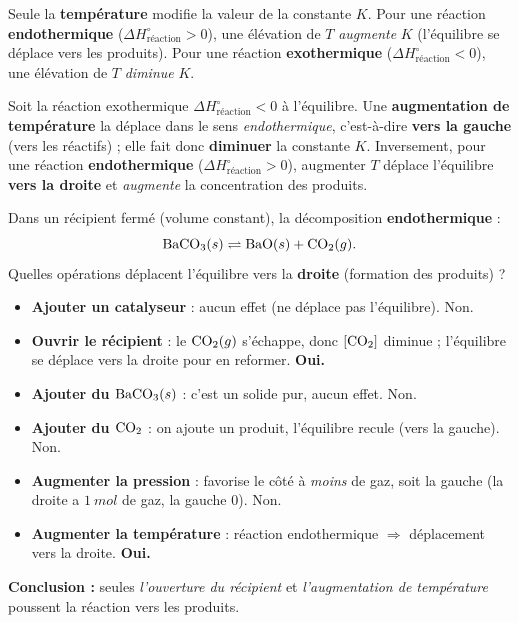 \documentclass[11pt,a4paper]{article}
\newcommand{\dHr}{\Delta H^{\circ}_{\text{réaction}}}
\begin{document}
\begin{theoreme}
Seule la \textbf{température} modifie la valeur de la constante $K$. Pour une réaction
\textbf{endothermique} ($\dHr > 0$), une élévation de $T$ \emph{augmente} $K$ (l'équilibre se déplace
vers les produits). Pour une réaction \textbf{exothermique} ($\dHr < 0$), une élévation de $T$
\emph{diminue} $K$.
\end{theoreme}

\begin{exemple}
Soit la réaction exothermique $\dHr < 0$ à l'équilibre. Une \textbf{augmentation de température} la
déplace dans le sens \emph{endothermique}, c'est-à-dire \textbf{vers la gauche} (vers les réactifs) ;
elle fait donc \textbf{diminuer} la constante $K$. Inversement, pour une réaction \textbf{endothermique}
($\dHr > 0$), augmenter $T$ déplace l'équilibre \textbf{vers la droite} et \emph{augmente} la
concentration des produits.
\end{exemple}

\begin{exemple}
Dans un récipient fermé (volume constant), la décomposition \textbf{endothermique} :
\[ \ce{BaCO3}(s) \rightleftharpoons \ce{BaO}(s) + \ce{CO2}(g). \]
Quelles opérations déplacent l'équilibre vers la \textbf{droite} (formation des produits) ?
\begin{itemize}[leftmargin=1.6em,topsep=2pt,itemsep=2pt]
  \item \textbf{Ajouter un catalyseur} : aucun effet (ne déplace pas l'équilibre). \textcolor{attncol}{Non.}
  \item \textbf{Ouvrir le récipient} : le $\ce{CO2}(g)$ s'échappe, donc $[\ce{CO2}]$ diminue ;
        l'équilibre se déplace vers la droite pour en reformer. \textcolor{excol}{\textbf{Oui.}}
  \item \textbf{Ajouter du $\ce{BaCO3}(s)$} : c'est un solide pur, aucun effet. \textcolor{attncol}{Non.}
  \item \textbf{Ajouter du $\ce{CO2}$} : on ajoute un produit, l'équilibre recule (vers la gauche).
        \textcolor{attncol}{Non.}
  \item \textbf{Augmenter la pression} : favorise le côté à \emph{moins} de gaz, soit la gauche (la
        droite a $\SI{1}{mol}$ de gaz, la gauche $0$). \textcolor{attncol}{Non.}
  \item \textbf{Augmenter la température} : réaction endothermique $\Rightarrow$ déplacement vers la
        droite. \textcolor{excol}{\textbf{Oui.}}
\end{itemize}
\textbf{Conclusion :} seules \emph{l'ouverture du récipient} et \emph{l'augmentation de température}
poussent la réaction vers les produits.
\end{exemple}
\end{document}
